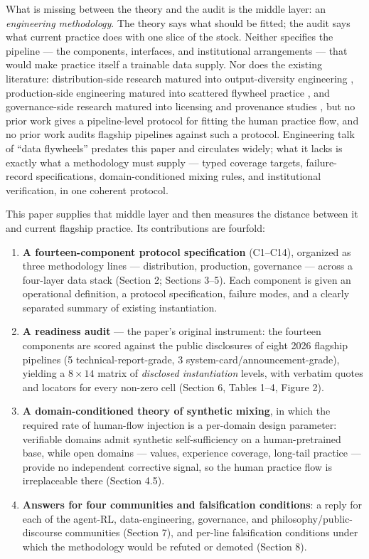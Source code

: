 \documentclass[10pt]{article}
\begin{document}
What is missing between the theory and the audit is the middle layer: an \emph{engineering methodology}. The theory says what should be fitted; the audit says what current practice does with one slice of the stock. Neither specifies the pipeline --- the components, interfaces, and institutional arrangements --- that would make practice itself a trainable data supply. Nor does the existing literature: distribution-side research matured into output-diversity engineering \cite{ref7}, production-side engineering matured into scattered flywheel practice \cite{ref8}, and governance-side research matured into licensing and provenance studies \cite{ref9,ref10}, but no prior work gives a pipeline-level protocol for fitting the human practice flow, and no prior work audits flagship pipelines against such a protocol. Engineering talk of ``data flywheels'' predates this paper and circulates widely; what it lacks is exactly what a methodology must supply --- typed coverage targets, failure-record specifications, domain-conditioned mixing rules, and institutional verification, in one coherent protocol.

This paper supplies that middle layer and then measures the distance between it and current flagship practice. Its contributions are fourfold:

\begin{enumerate}
\item \textbf{A fourteen-component protocol specification} (C1--C14), organized as three methodology lines --- distribution, production, governance --- across a four-layer data stack (Section 2; Sections 3--5). Each component is given an operational definition, a protocol specification, failure modes, and a clearly separated summary of existing instantiation.
\item \textbf{A readiness audit} --- the paper's original instrument: the fourteen components are scored against the public disclosures of eight 2026 flagship pipelines (5 technical-report-grade, 3 system-card/announcement-grade), yielding a $8\times14$ matrix of \emph{disclosed instantiation} levels, with verbatim quotes and locators for every non-zero cell (Section 6, Tables 1--4, Figure 2).
\item \textbf{A domain-conditioned theory of synthetic mixing}, in which the required rate of human-flow injection is a per-domain design parameter: verifiable domains admit synthetic self-sufficiency on a human-pretrained base, while open domains --- values, experience coverage, long-tail practice --- provide no independent corrective signal, so the human practice flow is irreplaceable there (Section 4.5).
\item \textbf{Answers for four communities and falsification conditions}: a reply for each of the agent-RL, data-engineering, governance, and philosophy/public-discourse communities (Section 7), and per-line falsification conditions under which the methodology would be refuted or demoted (Section 8).
\end{enumerate}
\end{document}
